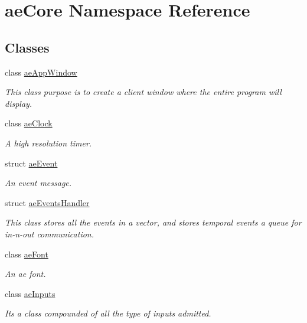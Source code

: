 \hypertarget{namespaceae_core}{}\section{ae\+Core Namespace Reference}
\label{namespaceae_core}
\subsection*{Classes}
\begin{DoxyCompactItemize}
\item 
class \hyperlink{classae_core_1_1ae_app_window}{ae\+App\+Window}
\begin{DoxyCompactList}\small\item\em This class purpose is to create a client window where the entire program will display. \end{DoxyCompactList}\item 
class \hyperlink{classae_core_1_1ae_clock}{ae\+Clock}
\begin{DoxyCompactList}\small\item\em A high resolution timer. \end{DoxyCompactList}\item 
struct \hyperlink{structae_core_1_1ae_event}{ae\+Event}
\begin{DoxyCompactList}\small\item\em An event message. \end{DoxyCompactList}\item 
struct \hyperlink{structae_core_1_1ae_events_handler}{ae\+Events\+Handler}
\begin{DoxyCompactList}\small\item\em This class stores all the events in a vector, and stores temporal events a queue for in-\/n-\/out communication. \end{DoxyCompactList}\item 
class \hyperlink{classae_core_1_1ae_font}{ae\+Font}
\begin{DoxyCompactList}\small\item\em An ae font. \end{DoxyCompactList}\item 
class \hyperlink{structae_core_1_1ae_inputs}{ae\+Inputs}
\begin{DoxyCompactList}\small\item\em It\textquotesingle{}s a class compounded of all the type of inputs admitted. \end{DoxyCompactList}\item 

\end{DoxyCompactItemize}
